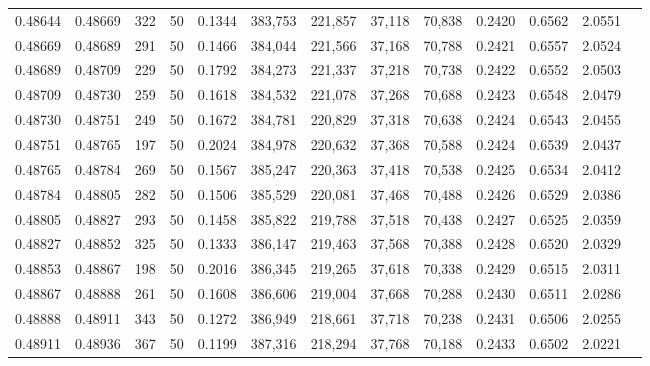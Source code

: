 \begin{tabular}{rrrrrrrrrrrrr}
0.48644 & 0.48669 &   322 &  50 &                                     0.1344 & 383,753 & 221,857 &  37,118 &  70,838 & 0.2420 & 0.6562 & 2.0551 \\
0.48669 & 0.48689 &   291 &  50 &                                     0.1466 & 384,044 & 221,566 &  37,168 &  70,788 & 0.2421 & 0.6557 & 2.0524 \\
0.48689 & 0.48709 &   229 &  50 &                                     0.1792 & 384,273 & 221,337 &  37,218 &  70,738 & 0.2422 & 0.6552 & 2.0503 \\
0.48709 & 0.48730 &   259 &  50 &                                     0.1618 & 384,532 & 221,078 &  37,268 &  70,688 & 0.2423 & 0.6548 & 2.0479 \\
0.48730 & 0.48751 &   249 &  50 &                                     0.1672 & 384,781 & 220,829 &  37,318 &  70,638 & 0.2424 & 0.6543 & 2.0455 \\
0.48751 & 0.48765 &   197 &  50 &                                     0.2024 & 384,978 & 220,632 &  37,368 &  70,588 & 0.2424 & 0.6539 & 2.0437 \\
0.48765 & 0.48784 &   269 &  50 &                                     0.1567 & 385,247 & 220,363 &  37,418 &  70,538 & 0.2425 & 0.6534 & 2.0412 \\
0.48784 & 0.48805 &   282 &  50 &                                     0.1506 & 385,529 & 220,081 &  37,468 &  70,488 & 0.2426 & 0.6529 & 2.0386 \\
0.48805 & 0.48827 &   293 &  50 &                                     0.1458 & 385,822 & 219,788 &  37,518 &  70,438 & 0.2427 & 0.6525 & 2.0359 \\
0.48827 & 0.48852 &   325 &  50 &                                     0.1333 & 386,147 & 219,463 &  37,568 &  70,388 & 0.2428 & 0.6520 & 2.0329 \\
0.48853 & 0.48867 &   198 &  50 &                                     0.2016 & 386,345 & 219,265 &  37,618 &  70,338 & 0.2429 & 0.6515 & 2.0311 \\
0.48867 & 0.48888 &   261 &  50 &                                     0.1608 & 386,606 & 219,004 &  37,668 &  70,288 & 0.2430 & 0.6511 & 2.0286 \\
0.48888 & 0.48911 &   343 &  50 &                                     0.1272 & 386,949 & 218,661 &  37,718 &  70,238 & 0.2431 & 0.6506 & 2.0255 \\
0.48911 & 0.48936 &   367 &  50 &                                     0.1199 & 387,316 & 218,294 &  37,768 &  70,188 & 0.2433 & 0.6502 & 2.0221 \\

\end{tabular}
